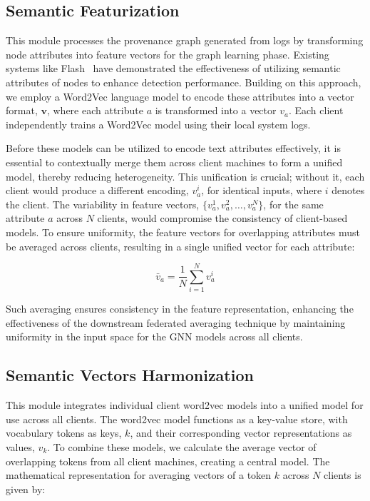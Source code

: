 \subsection{Semantic Featurization}
\label{semanfeat}

This module processes the provenance graph generated from \logs logs by transforming node attributes into feature vectors for the graph learning phase. Existing systems like Flash~\cite{flash2024} have demonstrated the effectiveness of utilizing semantic attributes of nodes to enhance detection performance. Building on this approach, we employ a Word2Vec language model to encode these attributes into a vector format, \(\mathbf{v}\), where each attribute \(a\) is transformed into a vector \(v_a\). Each client independently trains a Word2Vec model using their local system logs.

Before these models can be utilized to encode text attributes effectively, it is essential to contextually merge them across client machines to form a unified model, thereby reducing heterogeneity. This unification is crucial; without it, each client would produce a different encoding, \(v_a^i\), for identical inputs, where \(i\) denotes the client. The variability in feature vectors, \(\{v_a^1, v_a^2, \ldots, v_a^N\}\), for the same attribute \(a\) across \(N\) clients, would compromise the consistency of client-based \gnnshort models. To ensure uniformity, the feature vectors for overlapping attributes must be averaged across clients, resulting in a single unified vector for each attribute:

\[
\bar{v}_a = \frac{1}{N} \sum_{i=1}^{N} v_a^i
\]

Such averaging ensures consistency in the feature representation, enhancing the effectiveness of the downstream federated averaging technique by maintaining uniformity in the input space for the GNN models across all clients.

\subsection{Semantic Vectors Harmonization}
\label{semanticharmonization}

This module integrates individual client word2vec models into a unified model for use across all clients. The word2vec model functions as a key-value store, with vocabulary tokens as keys, \(k\), and their corresponding vector representations as values, \(v_k\). To combine these models, we calculate the average vector of overlapping tokens from all client machines, creating a central model. The mathematical representation for averaging vectors of a token \(k\) across \(N\) clients is given by:


